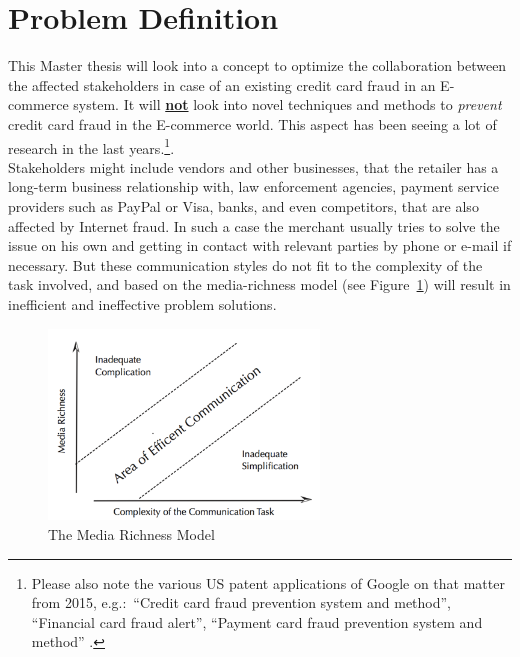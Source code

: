 
\section{Problem Definition}
\label{sec:problem_definition}

This Master thesis will look into a concept to optimize the collaboration between the affected stakeholders in case of an existing credit card fraud in an E-commerce system. It will \textbf{\underline{not}} look into novel techniques and methods to \textit{prevent} credit card fraud in the E-commerce world. This aspect has been seeing a lot of research in the last years.\footnote{Please also note the various US patent applications of Google on that matter from 2015, e.g.:\ “Credit card fraud prevention system and method”, “Financial card fraud alert”, “Payment card fraud prevention system and method” \citep{GooglePatents2015}.}. \\

Stakeholders might include vendors and other businesses, that the retailer has a long-term business relationship with, law enforcement agencies, payment service providers such as PayPal or Visa, banks, and even competitors, that are also affected by  Internet fraud. In such a case the merchant usually tries to solve the issue on his own and getting in contact with relevant parties by phone or e-mail if necessary. But these communication styles do not fit to the complexity of the task involved, and based on the media-richness model (see Figure~\ref{fig:images_media_richness_model}) will result in inefficient and ineffective problem solutions. \\

\begin{figure}[!ht]
	\centering
		\includegraphics[height=2in]{images/media-richness-model.png}
	\caption{The Media Richness Model \citep{Rice1992}}
\label{fig:images_media_richness_model}
\end{figure}

